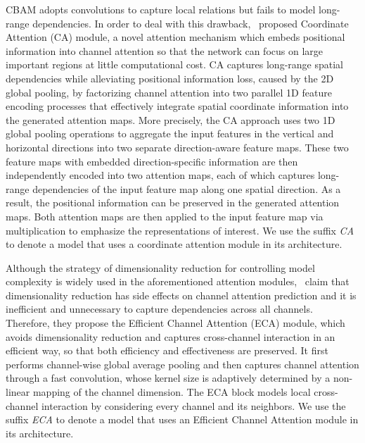 \documentclass[journal]{IEEEtran}
\begin{document}
CBAM adopts convolutions to capture local relations but fails to model long-range dependencies. In order to deal with this drawback,~\citep{Hou_2021_CVPR} proposed Coordinate Attention (CA) module, a novel attention mechanism which embeds positional information into channel attention so that the network can focus on large important regions at little computational cost. CA captures long-range spatial dependencies while alleviating positional information loss, caused by the 2D global pooling, by factorizing channel attention into two parallel 1D feature encoding processes that effectively integrate spatial coordinate information into the generated attention maps. More precisely, the CA approach uses two 1D global pooling operations to aggregate the input features in the vertical and horizontal directions into two separate direction-aware feature maps. These two feature maps with embedded direction-specific information are then independently encoded into two attention maps, each of which captures long-range dependencies of the input feature map along one spatial direction. As a result, the positional information can be preserved in the generated attention maps. Both attention maps are then applied to the input feature map via multiplication to emphasize the representations of interest. We use the suffix \textit{CA} to denote a model that uses a coordinate attention module in its architecture.

Although the strategy of dimensionality reduction for controlling model complexity is widely used in the aforementioned attention modules,~\cite{wang2020ecanet} claim that dimensionality reduction has side effects on channel attention prediction and it is inefficient and unnecessary to capture dependencies across all channels. Therefore, they propose the Efficient Channel Attention (ECA) module, which avoids dimensionality reduction and captures cross-channel interaction in an efficient way, so that both efficiency and effectiveness are preserved. It first performs channel-wise global average pooling and then captures channel attention through a fast  convolution, whose kernel size is adaptively determined by a non-linear mapping of the channel dimension. The ECA block models local cross-channel interaction by considering every channel and its  neighbors. We use the suffix \textit{ECA} to denote a model that uses an Efficient Channel Attention module in its architecture.
\end{document}
